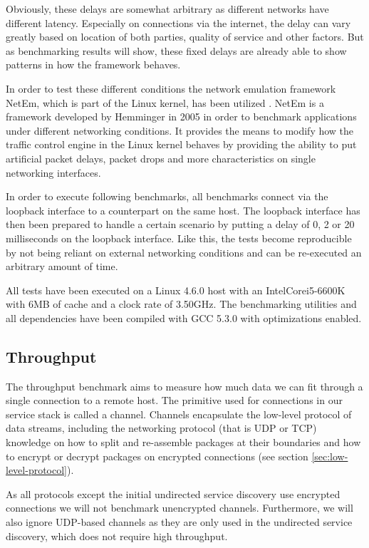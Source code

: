 Obviously, these delays are somewhat arbitrary as different networks have different latency.
Especially on connections via the internet, the delay can vary greatly based on location of both parties, quality of service and other factors.
But as benchmarking results will show, these fixed delays are already able to show patterns in how the framework behaves.

In order to test these different conditions the network emulation framework NetEm, which is part of the Linux kernel, has been utilized \cite{hemminger2005network}.
NetEm is a framework developed by Hemminger in 2005 in order to benchmark applications under different networking conditions.
It provides the means to modify how the traffic control engine in the Linux kernel behaves by providing the ability to put artificial packet delays, packet drops and more characteristics on single networking interfaces.

In order to execute following benchmarks, all benchmarks connect via the loopback interface to a counterpart on the same host.
The loopback interface has then been prepared to handle a certain scenario by putting a delay of 0, 2 or 20 milliseconds on the loopback interface.
Like this, the tests become reproducible by not being reliant on external networking conditions and can be re-executed an arbitrary amount of time.

\medskip

All tests have been executed on a Linux 4.6.0 host with an Intel\textregistered Core\texttrademark i5-6600K with 6MB of cache and a clock rate of 3.50GHz.
The benchmarking utilities and all dependencies have been compiled with GCC 5.3.0 with optimizations enabled.

\subsection{Throughput}

The throughput benchmark aims to measure how much data we can fit through a single connection to a remote host.
The primitive used for connections in our service stack is called a channel.
Channels encapsulate the low-level protocol of data streams, including the networking protocol (that is UDP or TCP) knowledge on how to split and re-assemble packages at their boundaries and how to encrypt or decrypt packages on encrypted connections (see section \ref{sec:low-level-protocol}).

As all protocols except the initial undirected service discovery use encrypted connections we will not benchmark unencrypted channels.
Furthermore, we will also ignore UDP-based channels as they are only used in the undirected service discovery, which does not require high throughput.

